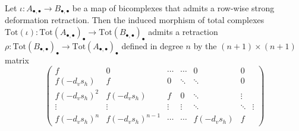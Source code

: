\begin{prop}[label=prop:A5]
    Let $\iota:A_{\bullet,\bullet}\to B_{\bullet,\bullet}$ be a map of bicomplexes that admits a row-wise strong deformation retraction. Then the induced morphism of total complexes $\text{Tot}(\iota):\text{Tot}(A_{\bullet,\bullet})_\bullet\to\text{Tot}(B_{\bullet,\bullet})_{\bullet}$ admits a retraction $\rho:\text{Tot}(B_{\bullet,\bullet})_{\bullet}\to \text{Tot}(A_{\bullet,\bullet})_{\bullet}$ defined in degree $n$ by the $(n+1)\times (n+1)$ matrix
    \begin{equation*}
        \begin{pmatrix}
            f & 0 & \cdots & \cdots & 0 & 0 \\
            f(-d_vs_h) & f & 0 & \ddots & \ddots & 0 \\
            f(-d_vs_h)^2 & f(-d_vs_h) & f & 0 & \ddots & \vdots \\
            \vdots & \vdots & \vdots &\vdots & \ddots & \ddots & \vdots \\
            f(-d_vs_h)^n & f(-d_vs_h)^{n-1} & \cdots & \cdots & f(-d_vs_h) & f 
        \end{pmatrix}
    \end{equation*}
\end{prop}
